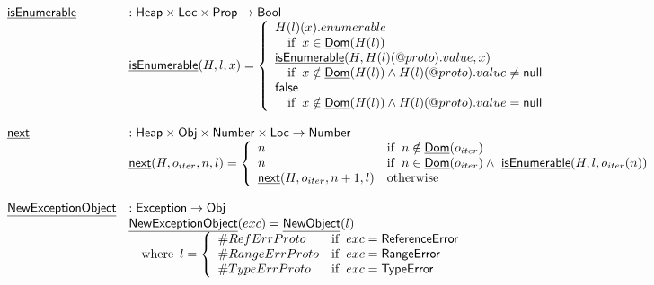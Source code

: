 \documentclass{article}
\makeatletter
\newcommand{\SF}[1]{\mbox{\textsf{#1}}}
\newcommand{\wherec}[1]{{\rm where}\begin{array}[t]{l}#1\end{array}}
\newcommand{\ifc}[1]{{\rm if}\begin{array}[t]{l}#1\end{array}}
\newcommand{\owc}{{\rm otherwise}}
\newcommand{\Heap}{\SF{Heap}}
\newcommand{\Loc}{\SF{Loc}}
\newcommand{\Prop}{\SF{Prop}}
\newcommand{\Obj}{\SF{Obj}}
\newcommand{\PValue}{\SF{PValue}}
\newcommand{\hf}[1]{\underline{\sf #1}}
\newcommand{\exc}[1]{{\sf #1}}
\newcommand{\varloc}[1]{\##1}
\newcommand{\varprop}[1]{@#1}
\newcommand{\vfalse}{\SF{false}}
\makeatother
\begin{document}
\[
\begin{array}{ll}
\hf{isEnumerable} & : \Heap \times \Loc \times \Prop \rightarrow \SF{Bool} \\
& \hf{isEnumerable}(H,l,x) =
  \left\{
    \begin{array}{l}
      H(l)(x).enumerable \\
      \quad\ifc{x\in\hf{Dom}(H(l))} \\
      \hf{isEnumerable}(H,H(l)(\varprop{proto}).value,x) \\
      \quad\ifc{x\notin\hf{Dom}(H(l)) \land H(l)(\varprop{proto}).value \neq \SF{null}} \\
      \vfalse \\
      \quad\ifc{x\notin\hf{Dom}(H(l)) \land H(l)(\varprop{proto}).value = \SF{null}} \\
    \end{array}
  \right.\\
\\
\hf{next} & : \Heap \times \Obj \times \SF{Number} \times \Loc \rightarrow \SF{Number} \\
& \hf{next}(H,o_{iter},n,l) = 
  \left\{
  \begin{array}{ll}
    n &\ifc{n\notin \hf{Dom}(o_{iter})} \\
    n &\ifc{n\in \hf{Dom}(o_{iter})
      \land\ \hf{isEnumerable}(H,l,o_{iter}(n))} \\
    \hf{next}(H,o_{iter},n+1,l) & \owc\\
  \end{array}
  \right.\\
\\
\hf{NewExceptionObject} & : \SF{Exception} \rightarrow \SF{Obj} \\
& \hf{NewExceptionObject}(exc) = \hf{NewObject}(l)\\
& \quad\wherec{
  l=\left\{
    \begin{array}{ll}
      \varloc{RefErrProto}&\ifc{exc = \exc{ReferenceError}} \\
      \varloc{RangeErrProto}&\ifc{exc = \exc{RangeError}} \\
      \varloc{TypeErrProto}&\ifc{exc = \exc{TypeError}} \\
    \end{array}
  \right.
}
\end{array}
\]
\end{document}
